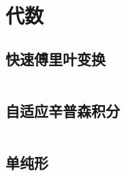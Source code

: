 \chapter{代数}
\section{快速傅里叶变换}
\inputminted{cpp}{\source/algebra/fast-fourier-transform.cpp}
\section{自适应辛普森积分}
\inputminted{cpp}{\source/algebra/adaptive-simpsons-method.cpp}
\section{单纯形}
\inputminted{cpp}{\source/algebra/simplex.cpp}
